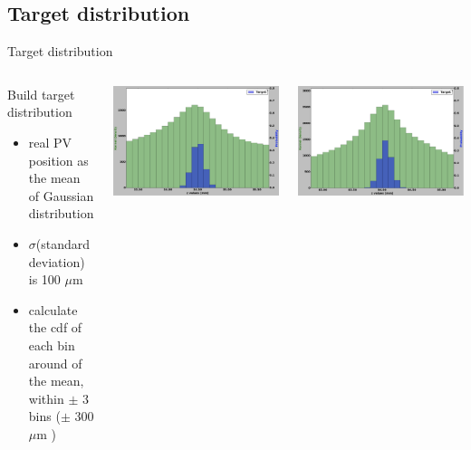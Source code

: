 \subsection{Target distribution}
\begin{frame}{Target distribution}
\begin{columns}[c]
    \begin{block}{Build target distribution}
      \begin{itemize}
          \item real PV position as the mean of Gaussian distribution
          \item $\sigma $(standard deviation) is 100 $\mu$m
          \item calculate the cdf of each bin around of the mean, within $\pm$ 3 bins ($\pm$ 300 $\mu$m )
      \end{itemize}
    \end{block}
    \begin{center}
            \includegraphics[width=1\textwidth,height=0.45\textwidth,trim=18 0 18 0]{images/T_1_12.png}

        \end{center}
      \begin{center}
    \includegraphics[width=1\textwidth,height=0.45\textwidth, trim=18 0 18 0]{images/T_2_12.png}


\end{center}
\end{columns}
\end{frame}
